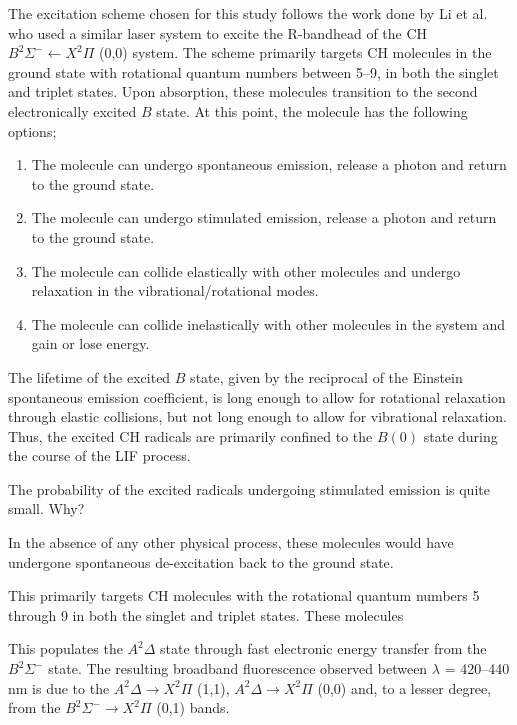 The excitation scheme chosen for this study follows the work done by Li et al.\cite{2007-li} who used a similar laser system to excite the R-bandhead of the CH \(B^2\Sigma^- \leftarrow X^2\Pi\) (0,0) system.
The scheme primarily targets CH molecules in the ground state with rotational quantum numbers between 5--9, in both the singlet and triplet states.
Upon absorption, these molecules transition to the second electronically excited \(B\) state.
At this point, the molecule has the following options;

\begin{enumerate}
\item The molecule can undergo spontaneous emission, release a photon and return to the ground state.
\item The molecule can undergo stimulated emission, release a photon and return to the ground state.
\item The molecule can collide elastically with other molecules and undergo relaxation in the vibrational/rotational modes.
\item The molecule can collide inelastically with other molecules in the system and gain or lose energy.
\end{enumerate}

The lifetime of the excited \(B\) state, given by the reciprocal of the Einstein spontaneous emission coefficient, is long enough to allow for rotational relaxation through elastic collisions, but not long enough to allow for vibrational relaxation.
Thus, the excited CH radicals are primarily confined to the \(B(0)\) state during the course of the LIF process.

The probability of the excited radicals undergoing stimulated emission is quite small. Why?






In the absence of any other physical process, these molecules would have undergone spontaneous de-excitation back to the ground state.



This primarily targets CH molecules with the rotational quantum numbers 5 through 9 in both the singlet and triplet states.
These molecules

This populates the \(A^2\Delta\) state through fast electronic energy transfer from the \(B^2\Sigma^-\) state.
The resulting broadband fluorescence observed between \(\lambda\) = 420--440 nm is due to the \(A^2\Delta \rightarrow X^2\Pi\) (1,1), \(A^2\Delta \rightarrow X^2\Pi\) (0,0) and, to a lesser degree, from the \(B^2\Sigma^- \rightarrow X^2\Pi\) (0,1) bands.

